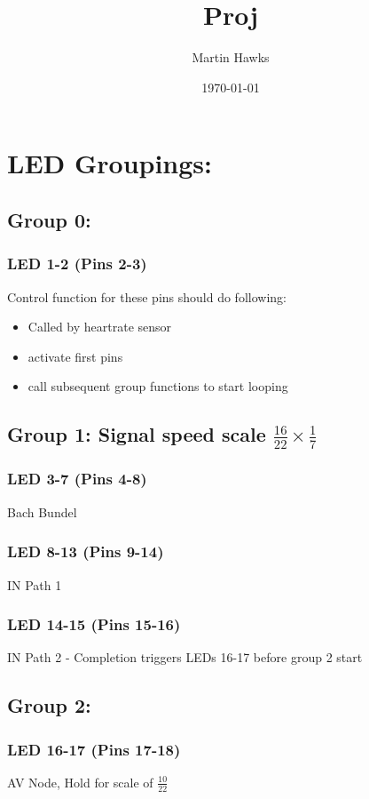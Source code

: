 \documentclass[11pt]{article}
\author{Martin Hawks}
\date{\today}
\title{Proj}
\begin{document}
\maketitle
\tableofcontents


\section{LED Groupings:}
\label{sec:org2ed4d61}
\subsection{Group 0:}
\label{sec:orgd0fa567}
\subsubsection{LED 1-2 (Pins 2-3)}
\label{sec:orgd9f1c5e}
Control function for these pins should do following:
\begin{itemize}
\item Called by heartrate sensor
\item activate first pins
\item call subsequent group functions to start looping
\end{itemize}
\subsection{Group 1: Signal speed scale \(\frac{16}{22} \times \frac{1}{7}\)}
\label{sec:orgdcebe1f}
\subsubsection{LED 3-7 (Pins 4-8)}
\label{sec:orgb965e32}
Bach Bundel
\subsubsection{LED 8-13 (Pins 9-14)}
\label{sec:org8fc3e9b}
IN Path 1
\subsubsection{LED 14-15 (Pins 15-16)}
\label{sec:orgfef0162}
IN Path 2 - Completion triggers LEDs 16-17 before group 2 start
\subsection{Group 2:}
\label{sec:org5a35ca7}
\subsubsection{LED 16-17 (Pins 17-18)}
\label{sec:org3e6e75b}
AV Node, Hold for scale of \(\frac{10}{22}\)
\end{document}
